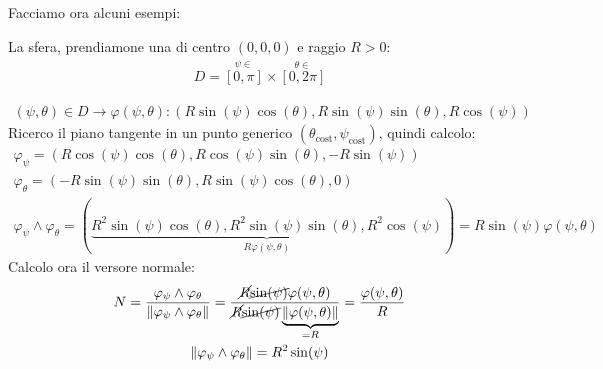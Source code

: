 \documentclass[a4paper, oneside]{article}
\begin{document}
Facciamo ora alcuni esempi:
\begin{example}
  La sfera, prendiamone una di centro $(0,0,0)$ e raggio $R>0$:
  \begin{gather*}
    D= \overset{\psi \in}{[0,\pi]} \times \overset{\theta \in}{[0,2\pi]}
  \end{gather*}
  \begin{center}
  \end{center}
  \begin{gather*}
    (\psi, \theta) \in D \to \varphi(\psi, \theta) :\left(
      R \sin(\psi) \cos(\theta),
      R \sin(\psi) \sin(\theta),
      R \cos(\psi)
    \right)
  \end{gather*}
  Ricerco il piano tangente in un punto generico $(\theta_\text{cost}, \psi_\text{cost})$, quindi calcolo:
  \begin{gather*}
    \varphi_\psi = \left(
      R \cos(\psi) \cos(\theta),
      R \cos(\psi) \sin(\theta),
      -R \sin(\psi)
    \right)\\
    \varphi_\theta = \left(
      -R \sin(\psi) \sin(\theta),
      R \sin(\psi) \cos(\theta),
      0
    \right)\\
    \varphi_\psi \land \varphi_\theta = \left( \underbrace{R^2\sin(\psi)\cos(\theta), R^2 \sin(\psi)\sin(\theta), R^2\cos(\psi)}_{R\varphi(\psi, \theta)} \right) = R \sin(\psi) \varphi(\psi, \theta)
  \end{gather*}
  Calcolo ora il versore normale:
  \begin{gather*}
    N = \frac{\varphi_\psi \land \varphi_\theta}{\left\lVert \varphi_\psi \land \varphi_\theta \right\rVert} = \frac{\cancel{R} \cancel{\sin(\psi)} \varphi(\psi, \theta) }{\cancel{R} \cancel{\sin(\psi)} \underbrace{\left\lVert \varphi(\psi, \theta) \right\rVert}_{= R} } = \frac{\varphi(\psi, \theta)}{R}\\
    \left\lVert \varphi_\psi \land \varphi_\theta \right\rVert = R^2 \sin(\psi) 
  \end{gather*}
\end{example}
\end{document}
